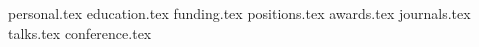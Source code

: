 \documentclass[margin,line]{res}
\newcommand*{\sectiondir}{sections/}
\begin{document}

\begin{resume}

{personal.tex}
{education.tex}
{funding.tex}
{positions.tex}
{awards.tex}
{journals.tex}
{talks.tex}
{conference.tex}

\end{resume}
\end{document}
